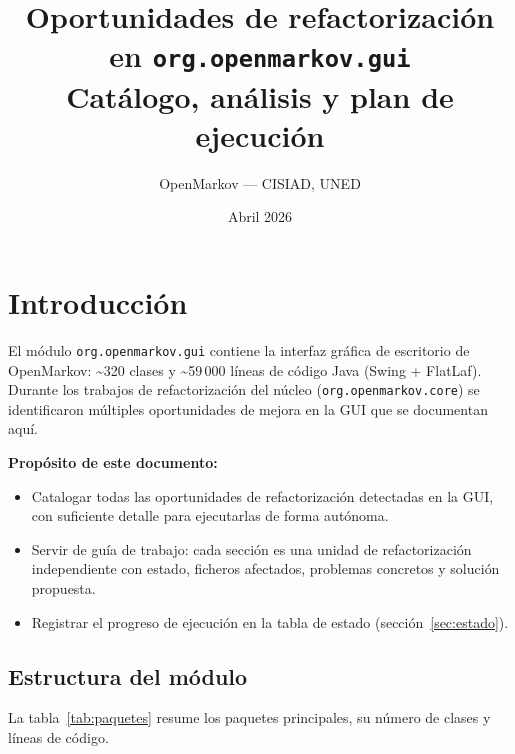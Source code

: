\documentclass[12pt,a4paper]{article}
\title{Oportunidades de refactorización en \texttt{org.openmarkov.gui} \\
       \large Catálogo, análisis y plan de ejecución}
\author{OpenMarkov --- CISIAD, UNED}
\date{Abril 2026}
\newcommand{\paquete}[1]{\texttt{#1}}
\begin{document}
\maketitle
\tableofcontents
\newpage

\section{Introducción}
\label{sec:intro}

El módulo \paquete{org.openmarkov.gui} contiene la interfaz gráfica
de escritorio de OpenMarkov: \textasciitilde320 clases y
\textasciitilde59\,000 líneas de código Java (Swing + FlatLaf).
Durante los trabajos de refactorización del núcleo
(\paquete{org.openmarkov.core}) se identificaron múltiples
oportunidades de mejora en la GUI que se documentan aquí.

\textbf{Propósito de este documento:}
\begin{itemize}
  \item Catalogar todas las oportunidades de refactorización detectadas en
        la GUI, con suficiente detalle para ejecutarlas de forma autónoma.
  \item Servir de guía de trabajo: cada sección es una unidad de
        refactorización independiente con estado, ficheros afectados,
        problemas concretos y solución propuesta.
  \item Registrar el progreso de ejecución en la tabla de estado
        (sección~\ref{sec:estado}).
\end{itemize}

\subsection{Estructura del módulo}
\label{sec:intro-estructura}

La tabla~\ref{tab:paquetes} resume los paquetes principales, su número
de clases y líneas de código.
\end{document}
